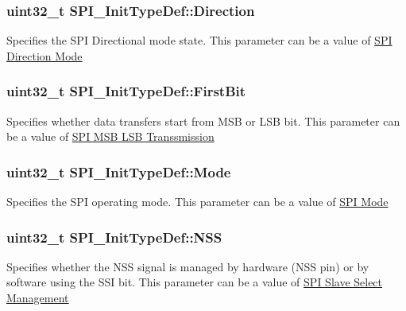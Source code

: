 \subsubsection[{\texorpdfstring{Direction}{Direction}}]{\setlength{\rightskip}{0pt plus 5cm}uint32\+\_\+t S\+P\+I\+\_\+\+Init\+Type\+Def\+::\+Direction}\hypertarget{struct_s_p_i___init_type_def_ae5c132f597c806d7a1fe316023b36867}{}\label{struct_s_p_i___init_type_def_ae5c132f597c806d7a1fe316023b36867}
Specifies the S\+PI Directional mode state. This parameter can be a value of \hyperlink{group___s_p_i___direction__mode}{S\+PI Direction Mode} 
\subsubsection[{\texorpdfstring{First\+Bit}{FirstBit}}]{\setlength{\rightskip}{0pt plus 5cm}uint32\+\_\+t S\+P\+I\+\_\+\+Init\+Type\+Def\+::\+First\+Bit}\hypertarget{struct_s_p_i___init_type_def_a8c541d8863cb62a3212b9381b5cba447}{}\label{struct_s_p_i___init_type_def_a8c541d8863cb62a3212b9381b5cba447}
Specifies whether data transfers start from M\+SB or L\+SB bit. This parameter can be a value of \hyperlink{group___s_p_i___m_s_b___l_s_b__transmission}{S\+PI M\+SB L\+SB Transsmission} 
\subsubsection[{\texorpdfstring{Mode}{Mode}}]{\setlength{\rightskip}{0pt plus 5cm}uint32\+\_\+t S\+P\+I\+\_\+\+Init\+Type\+Def\+::\+Mode}\hypertarget{struct_s_p_i___init_type_def_a5247eb0463437c9980a9d4a5300b50a5}{}\label{struct_s_p_i___init_type_def_a5247eb0463437c9980a9d4a5300b50a5}
Specifies the S\+PI operating mode. This parameter can be a value of \hyperlink{group___s_p_i__mode}{S\+PI Mode} 
\subsubsection[{\texorpdfstring{N\+SS}{NSS}}]{\setlength{\rightskip}{0pt plus 5cm}uint32\+\_\+t S\+P\+I\+\_\+\+Init\+Type\+Def\+::\+N\+SS}\hypertarget{struct_s_p_i___init_type_def_aed541d17808213ac6f90ac7deb2bec5f}{}\label{struct_s_p_i___init_type_def_aed541d17808213ac6f90ac7deb2bec5f}
Specifies whether the N\+SS signal is managed by hardware (N\+SS pin) or by software using the S\+SI bit. This parameter can be a value of \hyperlink{group___s_p_i___slave___select__management}{S\+PI Slave Select Management} 
